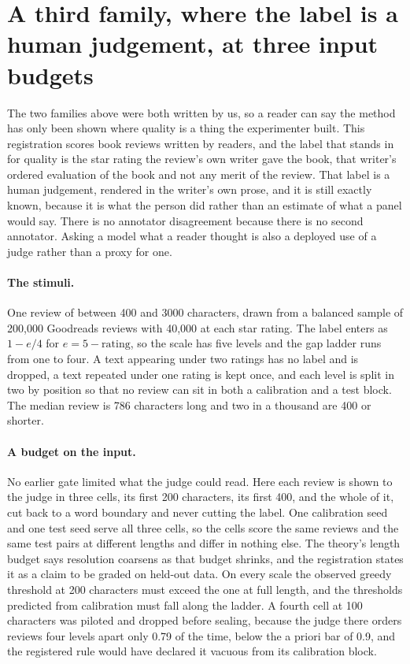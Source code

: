 
\section{A third family, where the label is a human judgement, at three input budgets}
\label{app:reviews}

The two families above were both written by us, so a reader can say the method has only been shown where quality is a thing the experimenter built. This registration scores book reviews written by readers, and the label that stands in for quality is the star rating the review's own writer gave the book, that writer's ordered evaluation of the book and not any merit of the review. That label is a human judgement, rendered in the writer's own prose, and it is still exactly known, because it is what the person did rather than an estimate of what a panel would say. There is no annotator disagreement because there is no second annotator. Asking a model what a reader thought is also a deployed use of a judge rather than a proxy for one.

\paragraph{The stimuli.}
One review of between 400 and 3000 characters, drawn from a balanced sample of 200,000 Goodreads reviews with 40,000 at each star rating. The label enters as $1-e/4$ for $e=5-\text{rating}$, so the scale has five levels and the gap ladder runs from one to four. A text appearing under two ratings has no label and is dropped, a text repeated under one rating is kept once, and each level is split in two by position so that no review can sit in both a calibration and a test block. The median review is 786 characters long and two in a thousand are 400 or shorter.

\paragraph{A budget on the input.}
No earlier gate limited what the judge could read. Here each review is shown to the judge in three cells, its first 200 characters, its first 400, and the whole of it, cut back to a word boundary and never cutting the label. One calibration seed and one test seed serve all three cells, so the cells score the same reviews and the same test pairs at different lengths and differ in nothing else. The theory's length budget says resolution coarsens as that budget shrinks, and the registration states it as a claim to be graded on held-out data. On every scale the observed greedy threshold at 200 characters must exceed the one at full length, and the thresholds predicted from calibration must fall along the ladder. A fourth cell at 100 characters was piloted and dropped before sealing, because the judge there orders reviews four levels apart only 0.79 of the time, below the a priori bar of 0.9, and the registered rule would have declared it vacuous from its calibration block.

